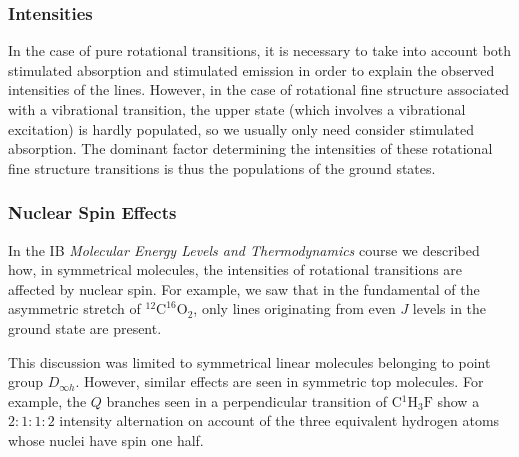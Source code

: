 \documentclass{article}
\theoremstyle{plain}\theoremheaderfont{\normalfont\itshape}\theorembodyfont{\rmfamily}\theoremseparator{.}\newtheorem*{rem}{Remark}\newtheorem*{ex}{Example}\newtheorem*{proof}{Proof}\newtheorem*{altp}{Alternative proof}
\theoremstyle{plain}\theoremheaderfont{\normalfont\bfseries}\theorembodyfont{\rmfamily}\theoremseparator{.}\newtheorem{thm}{Theorem}[section]\newtheorem{lem}[thm]{Lemma}\newtheorem{prop}[thm]{Proposition}\newtheorem*{cor}{Corollary}\newtheorem{defn}[thm]{Definition}\newtheorem{clm}[thm]{Claim}\newtheorem{clminproof}{Claim}\newtheorem{pos}{Postulate}[section]
\theoremstyle{break}\theoremheaderfont{\normalfont\itshape}\theorembodyfont{\rmfamily}\theoremseparator{.\medskip}\newtheorem*{proofskip}{Proof}\newtheorem*{exs}{Examples}\newtheorem*{rems}{Remarks}
\theoremstyle{break}\theoremheaderfont{\normalfont\bfseries}\theorembodyfont{\rmfamily}\theoremseparator{.\medskip}\newtheorem{lemskip}[thm]{Lemma}\newtheorem{defnskip}[thm]{Definition}\newtheorem{propskip}[thm]{Proposition}\newtheorem{thmskip}[thm]{Theorem}
\numberwithin{equation}{section}
\begin{document}
    \subsubsection{Intensities}
    In the case of pure rotational transitions, it is necessary to take into account both stimulated absorption and stimulated emission in order to explain the observed intensities of the lines. However, in the case of rotational fine structure associated with a vibrational transition, the upper state (which involves a vibrational excitation) is hardly populated, so we usually only need consider stimulated absorption. The dominant factor determining the intensities of these rotational fine structure transitions is thus the populations of the ground states.

    \subsubsection{Nuclear Spin Effects}
    In the IB \textit{Molecular Energy Levels and Thermodynamics} course we described how, in symmetrical molecules, the intensities of rotational transitions are affected by nuclear spin. For example, we saw that in the fundamental of the asymmetric stretch of \(\mathrm{^{12}C ^{16}O_2}\), only lines originating from even \(J\) levels in the ground state are present.

    This discussion was limited to symmetrical linear molecules belonging to point group \(D_{\infty h}\). However, similar effects are seen in symmetric top molecules. For example, the \(Q\) branches seen in a perpendicular transition of \(\mathrm{C {^{1}H_3} F}\) show a \(2:1:1:2\) intensity alternation on account of the three equivalent hydrogen atoms whose nuclei have spin one half.
\end{document}
